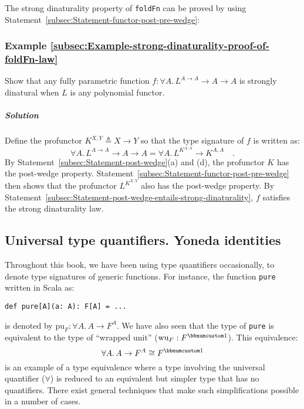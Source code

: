 The strong dinaturality property of \lstinline!foldFn! can be proved
by using Statement~\ref{subsec:Statement-functor-post-pre-wedge}:

\subsubsection{Example \label{subsec:Example-strong-dinaturality-proof-of-foldFn-law}\ref{subsec:Example-strong-dinaturality-proof-of-foldFn-law}}

Show that any fully parametric function $f:\forall A.\,L^{A\rightarrow A}\rightarrow A\rightarrow A$
is strongly dinatural when $L$ is any polynomial functor.

\subparagraph{Solution}

Define the profunctor $K^{X,Y}\triangleq X\rightarrow Y$ so that
the type signature of $f$ is written as:
\[
\forall A.\,L^{A\rightarrow A}\rightarrow A\rightarrow A=\forall A.\,L^{K^{A,A}}\rightarrow K^{A,A}\quad.
\]
By Statement~\ref{subsec:Statement-post-wedge}(a) and (d), the profunctor
$K$ has the post-wedge property. Statement~\ref{subsec:Statement-functor-post-pre-wedge}
then shows that the profunctor $L^{K^{X,Y}}$ also has the post-wedge
property. By Statement~\ref{subsec:Statement-post-wedge-entails-strong-dinaturality},
$f$ satisfies the strong dinaturality law. 

\subsection{Universal type quantifiers. Yoneda identities}

Throughout this book, we have been using type quantifiers occasionally,
to denote type signatures of generic functions. For instance, the
function \lstinline!pure! written in Scala as:
\begin{lstlisting}
def pure[A](a: A): F[A] = ...
\end{lstlisting}
is denoted by $\text{pu}_{F}:\forall A.\,A\rightarrow F^{A}$. We
have also seen that the type of \lstinline!pure! is equivalent to
the type of \textsf{``}wrapped unit\textsf{''} ($\text{wu}_{F}:F^{\bbnum 1}$). This
equivalence:
\[
\forall A.\,A\rightarrow F^{A}\cong F^{\bbnum 1}
\]
is an example of a type equivalence where a type involving the universal
quantifier ($\forall$) is reduced to an equivalent but simpler type
that has no quantifiers. There exist general techniques that make
such simplifications possible in a number of cases.

